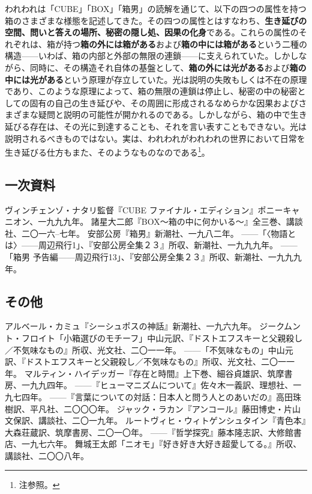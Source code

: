 \documentclass[b5j,twoside,twocolumn]{utarticle}
\begin{document}
われわれは「CUBE」「BOX」「箱男」の読解を通じて、以下の四つの属性を持つ箱のさまざまな様態を記述してきた。その四つの属性とはすなわち、\textbf{生き延びの空間、問いと答えの場所、秘密の隠し処、因果の化身}である。これらの属性のそれぞれは、箱が持つ\textbf{箱の外には箱がある}および\textbf{箱の中には箱がある}という二種の構造------いわば、箱の内部と外部の無限の連鎖------に支えられていた。しかしながら、同時に、その構造それ自体の基盤として、\textbf{箱の外には光がある}および\textbf{箱の中には光がある}という原理が存立していた。光は説明の失敗もしくは不在の原理であり、このような原理によって、箱の無限の連鎖は停止し、秘密の中の秘密としての固有の自己の生き延びや、その周囲に形成されるなめらかな因果およびさまざまな疑問と説明の可能性が開かれるのである。しかしながら、箱の中で生き延びる存在は、その光に到達することも、それを言い表すこともできない。光は説明されるべきものではない。実は、われわれがわれわれの世界において日常を生き延びる仕方もまた、そのようなものなのである\footnote{注参照。}。
\clearpage
\theendnotes
\begin{thebibliography}{99}
{\small
\subsection*{一次資料}
ヴィンチェンゾ・ナタリ監督『CUBE ファイナル・エディション』ポニーキャニオン、一九九九年。
諸星大二郎『BOX～箱の中に何かいる～』全三巻、講談社、二〇一六--七年。
安部公房『箱男』新潮社、一九八二年。
------「〈物語とは〉------周辺飛行1」、『安部公房全集２３』所収、新潮社、一九九九年。
------「箱男 予告編------周辺飛行13」、『安部公房全集２３』所収、新潮社、一九九九年。
\subsection*{その他}
アルベール・カミュ『シーシュポスの神話』新潮社、一九六九年。
ジークムント・フロイト「小箱選びのモチーフ」中山元訳、『ドストエフスキーと父親殺し／不気味なもの』所収、光文社、二〇一一年。
------「不気味なもの」中山元訳、『ドストエフスキーと父親殺し／不気味なもの』所収、光文社、二〇一一年。
マルティン・ハイデッガー『存在と時間』上下巻、細谷貞雄訳、筑摩書房、一九九四年。
------『ヒューマニズムについて』佐々木一義訳、理想社、一九七四年。
------『言葉についての対話：日本人と問う人とのあいだの』高田珠樹訳、平凡社、二〇〇〇年。
ジャック・ラカン『アンコール』藤田博史・片山文保訳、講談社、二〇一九年。
ルートヴィヒ・ウィトゲンシュタイン『青色本』大森荘蔵訳、筑摩書房、二〇一〇年。
------『哲学探究』藤本隆志訳、大修館書店、一九七六年。
舞城王太郎「ニオモ」『好き好き大好き超愛してる。』所収、講談社、二〇〇八年。
}
\end{thebibliography}
\end{document}
